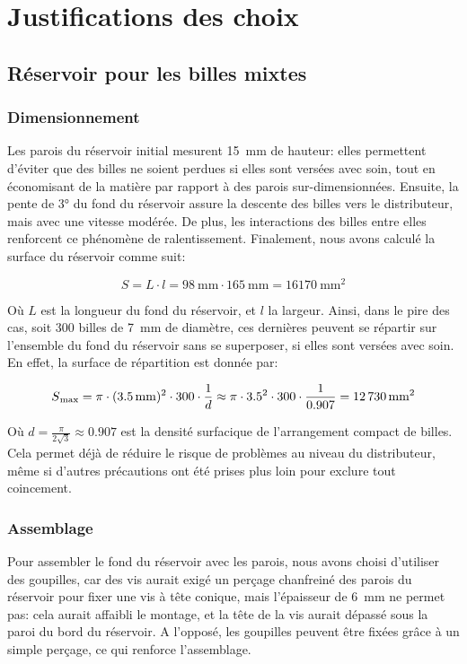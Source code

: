 \chapter{Justifications des choix}

\section{Réservoir pour les billes mixtes}

\subsection{Dimensionnement}
Les parois du réservoir initial mesurent \SI{15}{\milli\metre} de hauteur: elles permettent d'éviter que des billes ne soient perdues si elles sont versées avec soin, tout en économisant de la matière par rapport à des parois sur-dimensionnées. 
Ensuite, la pente de \ang{3} du fond du réservoir assure la descente des billes vers le distributeur, mais avec une vitesse modérée. De plus, les interactions des billes entre elles renforcent ce phénomène de ralentissement.
Finalement, nous avons calculé la surface du réservoir comme suit:

\[S = L \cdot l = \SI{98}{\milli\metre} \cdot \SI{165}{\milli\metre} = \SI{16170}{\milli\metre\squared}\]

Où $L$ est la longueur du fond du réservoir, et $l$ la largeur.
Ainsi, dans le pire des cas, soit \num{300} billes de \SI{7}{\milli\metre} de diamètre, ces dernières peuvent se répartir sur l'ensemble du fond du réservoir sans se superposer, si elles sont versées avec soin. En effet, la surface de répartition est donnée par:

\[S\textsubscript{max} = \pi \cdot (\SI{3.5}{\milli\metre})^{2} \cdot \num{300} \cdot \frac{1}{d} \approx  \pi \cdot {\num{3.5}}^{2} \cdot 300 \cdot \frac{1}{0.907} = \SI{12730}{\milli\metre\squared}\]

Où \(d = \frac{ \pi }{2\sqrt{3}} \approx \num{0.907}\) est la densité surfacique de l'arrangement compact de billes.
Cela permet déjà de réduire le risque de problèmes au niveau du distributeur, même si d'autres précautions ont été prises plus loin pour exclure tout coincement.

\subsection{Assemblage}
Pour assembler le fond du réservoir avec les parois, nous avons choisi d'utiliser des goupilles, car des vis aurait exigé un perçage chanfreiné des parois du réservoir pour fixer une vis à tête conique, mais l'épaisseur de \SI{6}{\mm} ne permet pas: cela aurait affaibli le montage, et la tête de la vis aurait dépassé sous la paroi du bord du réservoir. A l'opposé, les goupilles peuvent être fixées grâce à un simple perçage, ce qui renforce l'assemblage.

